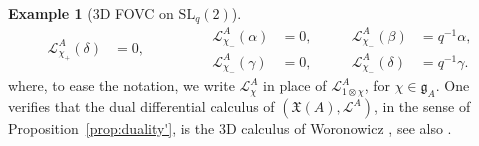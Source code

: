 \documentclass{article}
\theoremstyle{definition}
\newtheorem{example}[thm]{Example}
\newcommand{\fg}{{\mathfrak{g}}}
\begin{document}
\begin{example}[3D FOVC on $\mathrm{SL}_q(2)$]
\begin{equation}
\begin{split}
				\mathscr{L}^A_{\chi_+}(\delta)&=0,
			\end{split}\qquad\qquad
			\begin{split}
				\mathscr{L}^A_{\chi_-}(\alpha)&=0,\\
				\mathscr{L}^A_{\chi_-}(\gamma)&=0,
			\end{split}\qquad
			\begin{split}
				\mathscr{L}^A_{\chi_-}(\beta)&=q^{-1}\alpha,\\
				\mathscr{L}^A_{\chi_-}(\delta)&=q^{-1}\gamma.
			\end{split}
		\end{equation}
		where, to ease the notation, we write $\mathscr{L}^A_{\chi}$ in place of
		$\mathscr{L}^A_{1\otimes \chi}$, for $\chi \in \fg_A$. One verifies that the dual differential calculus of $(\mathfrak{X}(A),\mathscr{L}^A)$, in the sense of Proposition~\ref{prop:duality'}, is the 3D calculus of Woronowicz \cite{Woronowicz1989}, see also \cite[Example 2.32]{bm}.
	\end{example}
	
\end{document}
